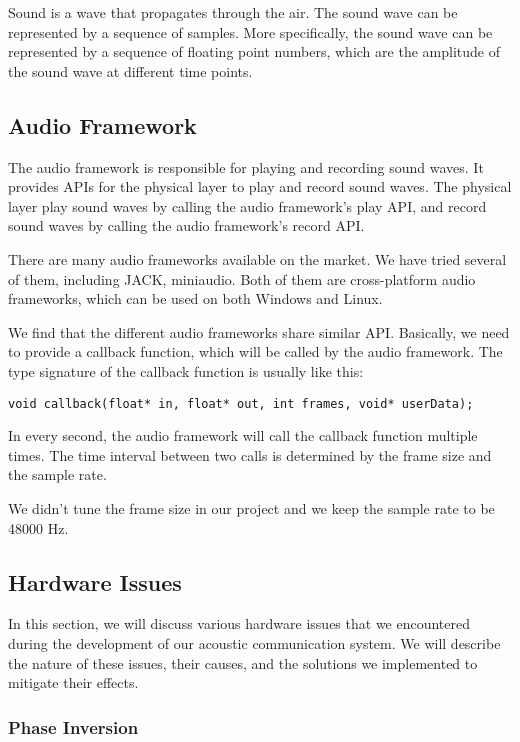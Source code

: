 \documentclass{article}
\begin{document}
Sound is a wave that propagates through the air.
The sound wave can be represented by a sequence of samples.
More specifically, the sound wave can be represented by a sequence of floating point numbers, which are the amplitude of the sound wave at different time points.

\subsection{Audio Framework}

The audio framework is responsible for playing and recording sound waves.
It provides APIs for the physical layer to play and record sound waves.
The physical layer play sound waves by calling the audio framework's play API, and record sound waves by calling the audio framework's record API.

There are many audio frameworks available on the market. We have tried several of them, including JACK, miniaudio. Both of them are cross-platform audio frameworks, which can be used on both Windows and Linux.

We find that the different audio frameworks share similar API.
Basically, we need to provide a callback function, which will be called by the audio framework.
The type signature of the callback function is usually like this:
\begin{verbatim}
void callback(float* in, float* out, int frames, void* userData);
\end{verbatim}

In every second, the audio framework will call the callback function multiple times.
The time interval between two calls is determined by the frame size and the sample rate.

We didn't tune the frame size in our project and we keep the sample rate to be 48000 Hz.

\subsection{Hardware Issues}

In this section, we will discuss various hardware issues that we encountered during the development of our acoustic communication system. We will describe the nature of these issues, their causes, and the solutions we implemented to mitigate their effects.

\subsubsection{Phase Inversion}
\end{document}
